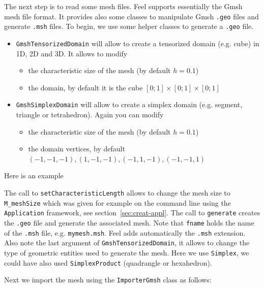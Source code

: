 \documentclass[a4paper]{book}
\newcommand{\feel}{Feel\xspace}
\begin{document}


The next step is to read some mesh files. \feel supports essentially
the Gmsh mesh file format. It provides also some classes to manipulate
Gmsh \lstinline!.geo! files and generate \lstinline!.msh! files. To
begin, we use some helper classes to generate a \lstinline!.geo! file.

\begin{itemize}
\item \lstinline!GmshTensorizedDomain! will allow to create a
  tensorized domain (e.g. cube) in 1D, 2D and 3D. It allows to modify
  \begin{itemize}
  \item the characteristic size of the mesh (by default $h=0.1$)
  \item the domain, by default it is the cube $[0;1]\times[0;1]\times[0;1]$
  \end{itemize}
\item \lstinline!GmshSimplexDomain! will allow to create a simplex
  domain (e.g. segment, triangle or tetrahedron). Again you can modify
  \begin{itemize}
  \item the characteristic size of the mesh (by default $h=0.1$)
  \item the domain vertices, by default $(-1,-1,-1), (1,-1,-1), (-1,1,-1), (-1,-1,1)$
  \end{itemize}
\end{itemize}

Here is an example



The call to \lstinline!setCharacteristicLength! allows to change the
mesh size to \lstinline!M_meshSize! which was given for example on the
command line using the \lstinline!Application! framework, see
section~\ref{sec:creat-appl}. The call to \lstinline!generate! creates
the \lstinline!.geo! file and generate the associated mesh. Note that
\lstinline!fname! holds the name of the \lstinline!.msh! file,
e.g. \lstinline!mymesh.msh!. \feel adds automatically the
\lstinline!.msh!  extension. Also note the last argument of
\lstinline!GmshTensorizedDomain!, it allows to change the type of
geometric entities used to generate the mesh. Here we use
\lstinline!Simplex!, we could have also used
\lstinline!SimplexProduct! (quadrangle or hexahedron).


Next we import the mesh using the
\lstinline!ImporterGmsh! class as follows:
\end{document}
